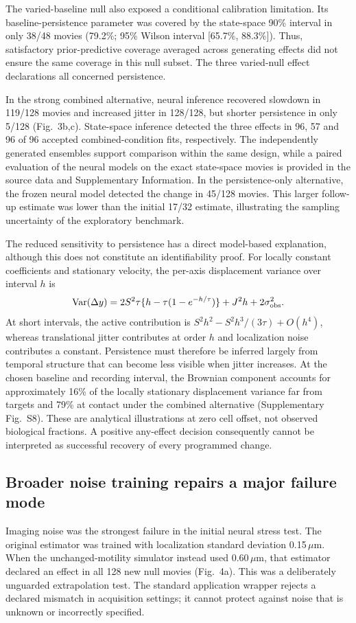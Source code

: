 \documentclass[12pt]{article}
\begin{document}
The varied-baseline null also exposed a conditional calibration limitation. Its baseline-persistence parameter was covered by the state-space 90\% interval in only 38/48 movies (79.2\%; 95\% Wilson interval [65.7\%, 88.3\%]). Thus, satisfactory prior-predictive coverage averaged across generating effects did not ensure the same coverage in this null subset. The three varied-null effect declarations all concerned persistence.

In the strong combined alternative, neural inference recovered slowdown in 119/128 movies and increased jitter in 128/128, but shorter persistence in only 5/128 (Fig.~3b,c). State-space inference detected the three effects in 96, 57 and 96 of 96 accepted combined-condition fits, respectively. The independently generated ensembles support comparison within the same design, while a paired evaluation of the neural models on the exact state-space movies is provided in the source data and Supplementary Information. In the persistence-only alternative, the frozen neural model detected the change in 45/128 movies. This larger follow-up estimate was lower than the initial 17/32 estimate, illustrating the sampling uncertainty of the exploratory benchmark.

The reduced sensitivity to persistence has a direct model-based explanation, although this does not constitute an identifiability proof. For locally constant coefficients and stationary velocity, the per-axis displacement variance over interval $h$ is
\begin{equation}
\operatorname{Var}(\Delta y)=2S^2\tau\{h-\tau(1-e^{-h/\tau})\}+J^2h+2\sigma_{\rm obs}^2.
\end{equation}
At short intervals, the active contribution is $S^2h^2-S^2h^3/(3\tau)+O(h^4)$, whereas translational jitter contributes at order $h$ and localization noise contributes a constant. Persistence must therefore be inferred largely from temporal structure that can become less visible when jitter increases. At the chosen baseline and recording interval, the Brownian component accounts for approximately 16\% of the locally stationary displacement variance far from targets and 79\% at contact under the combined alternative (Supplementary Fig.~S8). These are analytical illustrations at zero cell offset, not observed biological fractions. A positive any-effect decision consequently cannot be interpreted as successful recovery of every programmed change.

\subsection*{Broader noise training repairs a major failure mode}
Imaging noise was the strongest failure in the initial neural stress test. The original estimator was trained with localization standard deviation 0.15\,$\mu$m. When the unchanged-motility simulator instead used 0.60\,$\mu$m, that estimator declared an effect in all 128 new null movies (Fig.~4a). This was a deliberately unguarded extrapolation test. The standard application wrapper rejects a declared mismatch in acquisition settings; it cannot protect against noise that is unknown or incorrectly specified.
\end{document}
